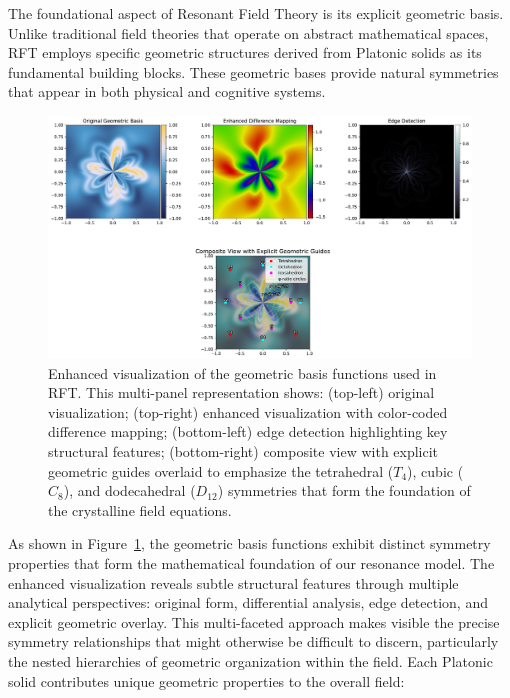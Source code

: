 \documentclass[12pt,letterpaper]{article}
\begin{document}
The foundational aspect of Resonant Field Theory is its explicit geometric basis. Unlike traditional field theories that operate on abstract mathematical spaces, RFT employs specific geometric structures derived from Platonic solids as its fundamental building blocks. These geometric bases provide natural symmetries that appear in both physical and cognitive systems.

\begin{figure}[H]
    \centering
    \includegraphics[width=\textwidth]{figures_enhanced_20250503_161506/geometric_basis_enhanced.pdf}
    \caption{Enhanced visualization of the geometric basis functions used in RFT. This multi-panel representation shows: (top-left) original visualization; (top-right) enhanced visualization with color-coded difference mapping; (bottom-left) edge detection highlighting key structural features; (bottom-right) composite view with explicit geometric guides overlaid to emphasize the tetrahedral ($T_4$), cubic ($C_8$), and dodecahedral ($D_{12}$) symmetries that form the foundation of the crystalline field equations.}
    \label{fig:geometric_basis}
\end{figure}

As shown in Figure~\ref{fig:geometric_basis}, the geometric basis functions exhibit distinct symmetry properties that form the mathematical foundation of our resonance model. The enhanced visualization reveals subtle structural features through multiple analytical perspectives: original form, differential analysis, edge detection, and explicit geometric overlay. This multi-faceted approach makes visible the precise symmetry relationships that might otherwise be difficult to discern, particularly the nested hierarchies of geometric organization within the field. Each Platonic solid contributes unique geometric properties to the overall field:
\end{document}
